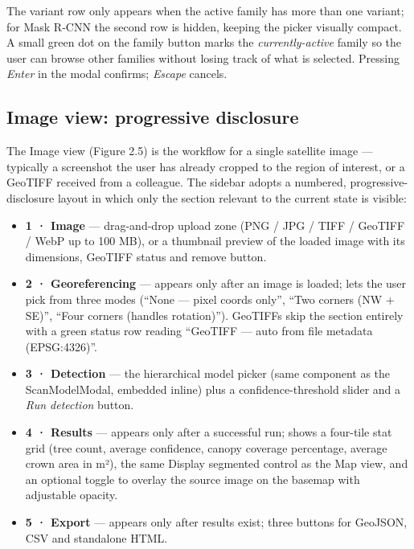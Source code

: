 The variant row only appears when the active family has more than one variant; for Mask R-CNN the second row is hidden, keeping the picker visually compact. A small green dot on the family button marks the \emph{currently-active} family so the user can browse other families without losing track of what is selected. Pressing \emph{Enter} in the modal confirms; \emph{Escape} cancels.

\subsection{Image view: progressive disclosure}\label{image-view-progressive-disclosure}

The Image view (Figure 2.5) is the workflow for a single satellite image --- typically a screenshot the user has already cropped to the region of interest, or a GeoTIFF received from a colleague. The sidebar adopts a numbered, progressive-disclosure layout in which only the section relevant to the current state is visible:

\begin{itemize}
\tightlist
\item
  \textbf{1 · Image} --- drag-and-drop upload zone (PNG / JPG / TIFF / GeoTIFF / WebP up to 100 MB), or a thumbnail preview of the loaded image with its dimensions, GeoTIFF status and remove button.
\item
  \textbf{2 · Georeferencing} --- appears only after an image is loaded; lets the user pick from three modes (``None --- pixel coords only'', ``Two corners (NW + SE)'', ``Four corners (handles rotation)''). GeoTIFFs skip the section entirely with a green status row reading ``GeoTIFF --- auto from file metadata (EPSG:4326)''.
\item
  \textbf{3 · Detection} --- the hierarchical model picker (same component as the ScanModelModal, embedded inline) plus a confidence-threshold slider and a \emph{Run detection} button.
\item
  \textbf{4 · Results} --- appears only after a successful run; shows a four-tile stat grid (tree count, average confidence, canopy coverage percentage, average crown area in m²), the same Display segmented control as the Map view, and an optional toggle to overlay the source image on the basemap with adjustable opacity.
\item
  \textbf{5 · Export} --- appears only after results exist; three buttons for GeoJSON, CSV and standalone HTML.
\end{itemize}

